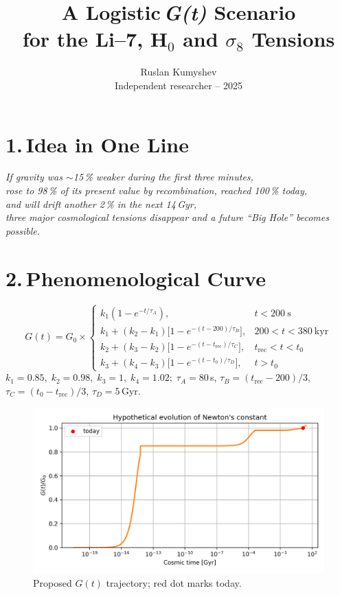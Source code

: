 ﻿\documentclass[11pt]{article}
\title{A Logistic\,\textit{G(t)} Scenario\\
       for the Li--7, H$_0$ and $\sigma_8$ Tensions}
\author{Ruslan Kumyshev\\\small Independent researcher -- 2025}
\date{}
\begin{document}
\maketitle


\section*{1.\,Idea in One Line}
\emph{If gravity was $\sim$15\,\% weaker during the first three minutes,\\
rose to 98\,\% of its present value by recombination, reached 100\,\% today,\\
and will drift another 2\,\% in the next 14\,Gyr,\\
three major cosmological tensions disappear and a future ``Big Hole'' becomes possible.}

\section*{2.\,Phenomenological Curve}
\[
G(t)=G_0\times
\begin{cases}
k_1(1-e^{-t/\tau_A}), & t<200~\mathrm{s}\\[4pt]
k_1+(k_2-k_1)\bigl[1-e^{-(t-200)/\tau_B}\bigr], & 200\!<\!t<380~\mathrm{kyr}\\
k_2+(k_3-k_2)\bigl[1-e^{-(t-t_\mathrm{rec})/\tau_C}\bigr], & t_\mathrm{rec}\!<\!t<t_0\\
k_3+(k_4-k_3)\bigl[1-e^{-(t-t_0)/\tau_D}\bigr], & t>t_0
\end{cases}
\]
\small
$k_1{=}0.85,\;k_2{=}0.98,\;k_3{=}1,\;k_4{=}1.02;\;
\tau_A{=}80$\,s, $\tau_B{=}(t_\mathrm{rec}\!-\!200)/3$,\\
$\tau_C{=}(t_0\!-\!t_\mathrm{rec})/3$, $\tau_D{=}5$ Gyr. \normalsize

\begin{figure}[h]\centering
\includegraphics[width=0.8\linewidth]{figures/G_evolution.png}
\caption{Proposed $G(t)$ trajectory; red dot marks today.}
\end{figure}
\end{document}
